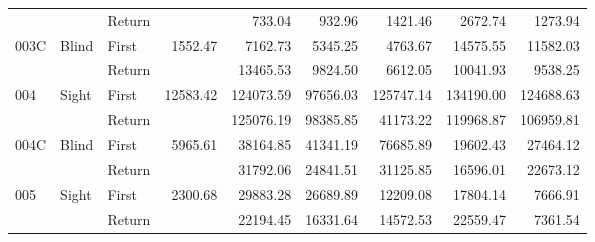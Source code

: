 \begin{table}[!htb]
\begin{tabular}{lllrrrrrr}
    &       & Return &           &     733.04 &     932.96 &                                               1421.46 &                                                2672.74 &    1273.94 \\
003C & Blind & First &   1552.47 &    7162.73 &    5345.25 &                                               4763.67 &                                               14575.55 &   11582.03 \\
    &       & Return &           &   13465.53 &    9824.50 &                                               6612.05 &                                               10041.93 &    9538.25 \\
004 & Sight & First &  12583.42 &  124073.59 &   97656.03 &                                             125747.14 &                                              134190.00 &  124688.63 \\
    &       & Return &           &  125076.19 &   98385.85 &                                              41173.22 &                                              119968.87 &  106959.81 \\
004C & Blind & First &   5965.61 &   38164.85 &   41341.19 &                                              76685.89 &                                               19602.43 &   27464.12 \\
    &       & Return &           &   31792.06 &   24841.51 &                                              31125.85 &                                               16596.01 &   22673.12 \\
005 & Sight & First &   2300.68 &   29883.28 &   26689.89 &                                              12209.08 &                                               17804.14 &    7666.91 \\
    &       & Return &           &   22194.45 &   16331.64 &                                              14572.53 &                                               22559.47 &    7361.54 \\
\bottomrule
\end{tabular}
\end{table}

